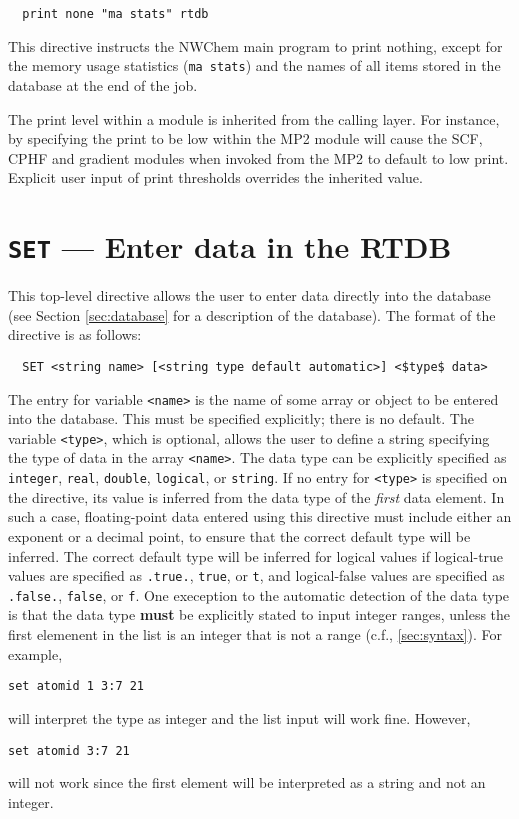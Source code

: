 \begin{verbatim}
  print none "ma stats" rtdb
\end{verbatim}

This directive instructs the NWChem main program to print nothing,
except for the memory usage statistics (\verb+ma stats+) and
the names of all items stored in the database at the end of the job.

The print level within a module is inherited from the 
calling layer.  For instance, by specifying the print to be low
within the MP2 module will cause the SCF, CPHF and gradient modules
when invoked from the MP2 to default to low print.  Explicit user
input of print thresholds overrides the inherited value.

\section{{\tt SET} --- Enter data in the RTDB}
\label{sec:set}

This top-level directive allows the user to enter data directly into the
database (see Section \ref{sec:database} for a description of the database).
The format of the directive is as follows:

\begin{verbatim}
  SET <string name> [<string type default automatic>] <$type$ data>
\end{verbatim}

The entry for variable \verb+<name>+ is the name of some array or
object to be entered into the database.  This must be specified
explicitly; there is no default.  The variable \verb+<type>+, which is
optional, allows the user to define a string specifying the type of
data in the array \verb+<name>+.  The data type can be explicitly
specified as \verb+integer+, \verb+real+, \verb+double+,
\verb+logical+, or \verb+string+.  If no entry for \verb+<type>+ is
specified on the directive, its value is inferred from the data type
of the {\em first} data element.  In such a case, floating-point data
entered using this directive must include either an exponent or a
decimal point, to ensure that the correct default type will be
inferred.  The correct default type will be inferred for logical
values if logical-true values are specified as \verb+.true.+,
\verb+true+, or \verb+t+, and logical-false values are specified as
\verb+.false.+, \verb+false+, or \verb+f+.  One exeception to the
automatic detection of the data type is that the data type {\bf must}
be explicitly stated to input integer ranges, unless the first
elemenent in the list is an integer that is not a range (c.f.,
\ref{sec:syntax}).  For example,
\begin{verbatim}
set atomid 1 3:7 21
\end{verbatim}
will interpret the type as integer and the list input will work fine.
However, 
\begin{verbatim}
set atomid 3:7 21
\end{verbatim}
will not work since the first element will be interpreted as a
string and not an integer.

